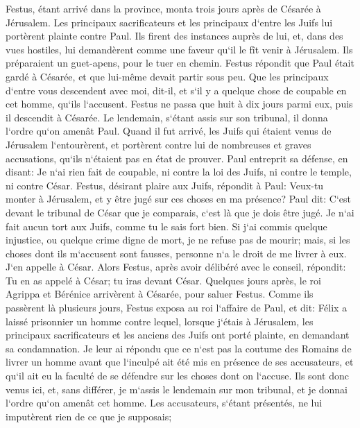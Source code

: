 \verse Festus, étant arrivé dans la province, monta trois jours après de Césarée à Jérusalem. 
\verse Les principaux sacrificateurs et les principaux d`entre les Juifs lui portèrent plainte contre Paul. Ils firent des instances auprès de lui, et, dans des vues hostiles, 
\verse lui demandèrent comme une faveur qu`il le fît venir à Jérusalem. Ils préparaient un guet-apens, pour le tuer en chemin. 
\verse Festus répondit que Paul était gardé à Césarée, et que lui-même devait partir sous peu. 
\verse Que les principaux d`entre vous descendent avec moi, dit-il, et s`il y a quelque chose de coupable en cet homme, qu`ils l`accusent. 
\verse Festus ne passa que huit à dix jours parmi eux, puis il descendit à Césarée. Le lendemain, s`étant assis sur son tribunal, il donna l`ordre qu`on amenât Paul. 
\verse Quand il fut arrivé, les Juifs qui étaient venus de Jérusalem l`entourèrent, et portèrent contre lui de nombreuses et graves accusations, qu`ils n`étaient pas en état de prouver. 
\verse Paul entreprit sa défense, en disant: Je n`ai rien fait de coupable, ni contre la loi des Juifs, ni contre le temple, ni contre César. 
\verse Festus, désirant plaire aux Juifs, répondit à Paul: Veux-tu monter à Jérusalem, et y être jugé sur ces choses en ma présence? 
\verse Paul dit: C`est devant le tribunal de César que je comparais, c`est là que je dois être jugé. Je n`ai fait aucun tort aux Juifs, comme tu le sais fort bien. 
\verse Si j`ai commis quelque injustice, ou quelque crime digne de mort, je ne refuse pas de mourir; mais, si les choses dont ils m`accusent sont fausses, personne n`a le droit de me livrer à eux. J`en appelle à César. 
\verse Alors Festus, après avoir délibéré avec le conseil, répondit: Tu en as appelé à César; tu iras devant César. 
\verse Quelques jours après, le roi Agrippa et Bérénice arrivèrent à Césarée, pour saluer Festus. 
\verse Comme ils passèrent là plusieurs jours, Festus exposa au roi l`affaire de Paul, et dit: Félix a laissé prisonnier un homme 
\verse contre lequel, lorsque j`étais à Jérusalem, les principaux sacrificateurs et les anciens des Juifs ont porté plainte, en demandant sa condamnation. 
\verse Je leur ai répondu que ce n`est pas la coutume des Romains de livrer un homme avant que l`inculpé ait été mis en présence de ses accusateurs, et qu`il ait eu la faculté de se défendre sur les choses dont on l`accuse. 
\verse Ils sont donc venus ici, et, sans différer, je m`assis le lendemain sur mon tribunal, et je donnai l`ordre qu`on amenât cet homme. 
\verse Les accusateurs, s`étant présentés, ne lui imputèrent rien de ce que je supposais; 
